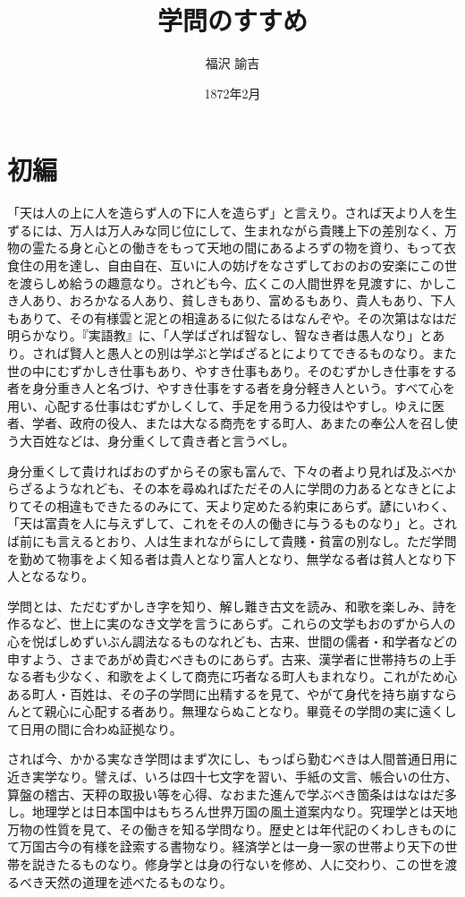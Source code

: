 \documentclass[a4paper, platex, dvipdfmx]{jsarticle}
\title{学問のすすめ}
\date{1872年2月}
\author{福沢 諭吉}
\begin{document}
\maketitle
\section{初編}
「天は人の上に人を造らず人の下に人を造らず」と言えり。されば天より人を生ずるには、万人は万人みな同じ位にして、生まれながら貴賤上下の差別なく、万物の霊たる身と心との働きをもって天地の間にあるよろずの物を資り、もって衣食住の用を達し、自由自在、互いに人の妨げをなさずしておのおの安楽にこの世を渡らしめ給うの趣意なり。されども今、広くこの人間世界を見渡すに、かしこき人あり、おろかなる人あり、貧しきもあり、富めるもあり、貴人もあり、下人もありて、その有様雲と泥との相違あるに似たるはなんぞや。その次第はなはだ明らかなり。『実語教』に、「人学ばざれば智なし、智なき者は愚人なり」とあり。されば賢人と愚人との別は学ぶと学ばざるとによりてできるものなり。また世の中にむずかしき仕事もあり、やすき仕事もあり。そのむずかしき仕事をする者を身分重き人と名づけ、やすき仕事をする者を身分軽き人という。すべて心を用い、心配する仕事はむずかしくして、手足を用うる力役はやすし。ゆえに医者、学者、政府の役人、または大なる商売をする町人、あまたの奉公人を召し使う大百姓などは、身分重くして貴き者と言うべし。

身分重くして貴ければおのずからその家も富んで、下々の者より見れば及ぶべからざるようなれども、その本を尋ぬればただその人に学問の力あるとなきとによりてその相違もできたるのみにて、天より定めたる約束にあらず。諺にいわく、「天は富貴を人に与えずして、これをその人の働きに与うるものなり」と。されば前にも言えるとおり、人は生まれながらにして貴賤・貧富の別なし。ただ学問を勤めて物事をよく知る者は貴人となり富人となり、無学なる者は貧人となり下人となるなり。

学問とは、ただむずかしき字を知り、解し難き古文を読み、和歌を楽しみ、詩を作るなど、世上に実のなき文学を言うにあらず。これらの文学もおのずから人の心を悦ばしめずいぶん調法なるものなれども、古来、世間の儒者・和学者などの申すよう、さまであがめ貴むべきものにあらず。古来、漢学者に世帯持ちの上手なる者も少なく、和歌をよくして商売に巧者なる町人もまれなり。これがため心ある町人・百姓は、その子の学問に出精するを見て、やがて身代を持ち崩すならんとて親心に心配する者あり。無理ならぬことなり。畢竟その学問の実に遠くして日用の間に合わぬ証拠なり。

されば今、かかる実なき学問はまず次にし、もっぱら勤むべきは人間普通日用に近き実学なり。譬えば、いろは四十七文字を習い、手紙の文言、帳合いの仕方、算盤の稽古、天秤の取扱い等を心得、なおまた進んで学ぶべき箇条ははなはだ多し。地理学とは日本国中はもちろん世界万国の風土道案内なり。究理学とは天地万物の性質を見て、その働きを知る学問なり。歴史とは年代記のくわしきものにて万国古今の有様を詮索する書物なり。経済学とは一身一家の世帯より天下の世帯を説きたるものなり。修身学とは身の行ないを修め、人に交わり、この世を渡るべき天然の道理を述べたるものなり。
\end{document}
